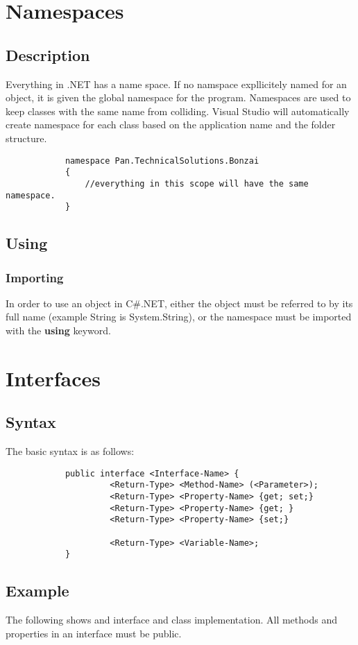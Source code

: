 \documentclass {amsart}
\begin{document}
\section{Namespaces}
	\subsection{Description} Everything in .NET has a name space.  If no namspace expllicitely named for an object, it is given the global namespace for the program.  Namespaces are used to keep classes with the same name from colliding.  Visual Studio will automatically create namespace for each class based on the application name and the folder structure. 

		\begin{lstlisting}
			namespace Pan.TechnicalSolutions.Bonzai
			{
				//everything in this scope will have the same namespace.  
			}
		\end{lstlisting}

	\subsection {Using}
		\subsubsection {Importing}  In order to use an object in C\#.NET, either the object must be referred to by its full name (example String is System.String), or the namespace must be imported with the {\bf using} keyword.  
		

\section{Interfaces}
	\subsection{Syntax} The basic syntax is as follows: 
		\begin{verbatim}
			public interface <Interface-Name> {
				     <Return-Type> <Method-Name> (<Parameter>);
				     <Return-Type> <Property-Name> {get; set;}
				     <Return-Type> <Property-Name> {get; }
				     <Return-Type> <Property-Name> {set;}

				     <Return-Type> <Variable-Name>;
			}
		\end{verbatim} 
	\subsection{Example}  The following shows and interface and class implementation.  All methods and properties in an interface must be public. 
\end{document}
